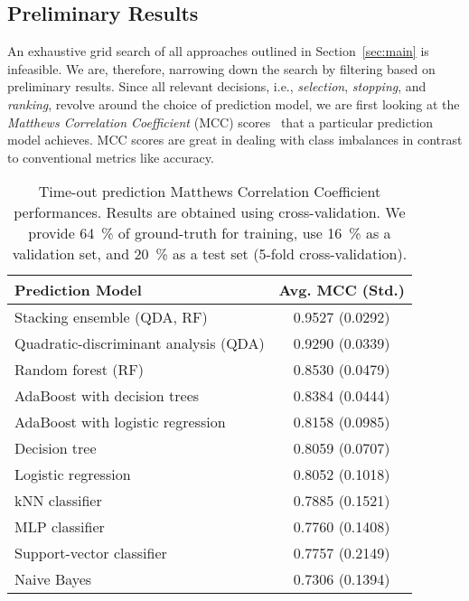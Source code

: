 \documentclass[runningheads]{llncs}
\begin{document}
\subsection{Preliminary Results}
\label{sec:evalprel}
An exhaustive grid search of all approaches outlined in Section~\ref{sec:main} is infeasible.
We are, therefore, narrowing down the search by filtering based on preliminary results.
Since all relevant decisions, i.e., \emph{selection}, \emph{stopping}, and \emph{ranking}, revolve around the choice of prediction model, we are first looking at the \emph{Matthews Correlation Coefficient} (MCC) scores~\cite{gorodkin2004comparing,matthews1975comparison} that a particular prediction model achieves.
MCC scores are great in dealing with class imbalances in contrast to conventional metrics like accuracy.

\begin{table}
  \centering
  \caption{
  	Time-out prediction Matthews Correlation Coefficient performances.
  	Results are obtained using cross-validation.
  	We provide \SI{64}{\%} of ground-truth for training, use \SI{16}{\%} as a validation set, and \SI{20}{\%} as a test set (5-fold cross-validation).
  }
  \label{tab:mcc}
  \begin{tabular}{lc}
    Prediction Model & Avg. MCC (Std.) \\
    \hline
    Stacking ensemble (QDA, RF)           & 0.9527 (0.0292) \\
    Quadratic-discriminant analysis (QDA) & 0.9290 (0.0339) \\
    Random forest (RF)                    & 0.8530 (0.0479) \\
    AdaBoost with decision trees          & 0.8384 (0.0444) \\
    AdaBoost with logistic regression     & 0.8158 (0.0985) \\
    Decision tree                         & 0.8059 (0.0707) \\
    Logistic regression                   & 0.8052 (0.1018) \\
    kNN classifier                        & 0.7885 (0.1521) \\
    MLP classifier                        & 0.7760 (0.1408) \\
    Support-vector classifier             & 0.7757 (0.2149) \\
    Naive Bayes                           & 0.7306 (0.1394) \\
    \hline
  \end{tabular}
\end{table}
\end{document}
